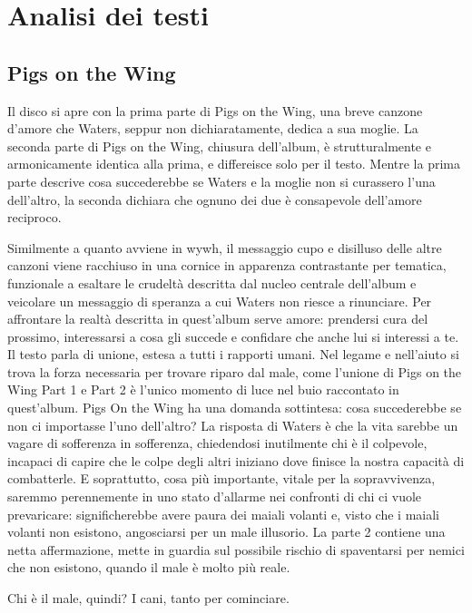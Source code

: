 \documentclass[class=book, crop=false, oneside, 12pt]{standalone}
\begin{document}
    \section{Analisi dei testi}
    \label{sec:02-animals-lyrics}

    \subsection{Pigs on the Wing}
    Il disco si apre con la prima parte di Pigs on the Wing, una breve canzone d'amore che Waters, seppur non dichiaratamente, dedica a sua moglie. La seconda parte di Pigs on the Wing, chiusura dell'album, è strutturalmente e armonicamente  identica alla prima, e differeisce solo per il testo. Mentre la prima parte descrive cosa succederebbe se Waters e la moglie non si curassero l'una dell'altro, la seconda dichiara che ognuno dei due è consapevole dell'amore reciproco. 

    Similmente a quanto avviene in \acrlong{wywh}, il messaggio cupo e disilluso delle altre canzoni viene racchiuso in una cornice in apparenza contrastante per tematica, funzionale a esaltare le crudeltà descritta dal nucleo centrale dell'album e veicolare un messaggio di speranza a cui Waters non riesce a rinunciare. Per affrontare la realtà descritta in quest'album serve amore: prendersi cura del prossimo, interessarsi a cosa gli succede e confidare che anche lui si interessi a te. Il testo parla di unione, estesa a tutti i rapporti umani. Nel legame e nell'aiuto si trova la forza necessaria per trovare riparo dal male, come l'unione di Pigs on the Wing Part 1 e Part 2  è l'unico momento di luce nel buio raccontato in quest'album. Pigs On the Wing ha una domanda sottintesa: cosa succederebbe se non ci importasse l'uno dell'altro? La risposta di Waters è che la vita sarebbe un vagare di sofferenza in sofferenza, chiedendosi inutilmente chi è il colpevole, incapaci di capire che le colpe degli altri iniziano dove finisce la nostra capacità di combatterle. E soprattutto, cosa più importante, vitale per la sopravvivenza, saremmo perennemente in uno stato d'allarme nei confronti di chi ci vuole prevaricare: significherebbe avere paura dei maiali volanti e, visto che i maiali volanti non esistono, angosciarsi per un male illusorio. La parte 2 contiene una netta affermazione, mette in guardia sul possibile rischio di spaventarsi per nemici che non esistono, quando il male è molto più reale.

    Chi è il male, quindi? I cani, tanto per cominciare.
\end{document}

